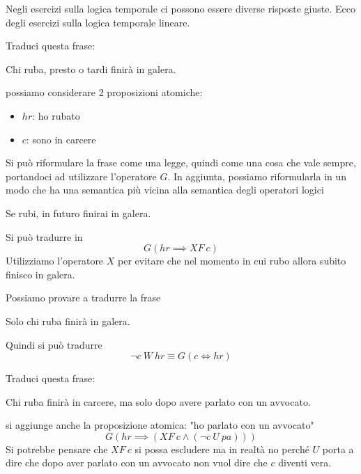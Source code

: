 Negli esercizi sulla logica temporale ci possono essere diverse risposte giuste.
Ecco degli esercizi sulla logica temporale lineare.
\begin{esempio}
    Traduci questa frase:
    \begin{center}
        Chi ruba, presto o tardi finirà in galera.
    \end{center}
    possiamo considerare 2 proposizioni atomiche:
    \begin{itemize}
        \item $hr$: ho rubato 
        \item $c$: sono in carcere
    \end{itemize}
    Si può riformulare la frase come una legge, quindi come una cosa che vale sempre,
    portandoci ad utilizzare l'operatore $G$. In aggiunta, possiamo riformularla
    in un modo che ha una semantica più vicina alla semantica degli operatori logici
    \begin{center}
        Se rubi, in futuro finirai in galera.
    \end{center}
    Si può tradurre in
    \begin{equation}
        G(hr\implies XF \ c)
    \end{equation}
    Utilizziamo l'operatore $X$ per evitare che nel momento in cui rubo allora 
    subito finisco in galera.

    Possiamo provare a tradurre la frase
    \begin{center}
        Solo chi ruba finirà in galera.
    \end{center}
    Quindi si può tradurre 
    \begin{equation}
        \lnot c \ W \ hr \equiv G(c \iff hr)
    \end{equation}
\end{esempio}
\begin{esempio}
    Traduci questa frase:
    \begin{center}
        Chi ruba finirà in carcere, ma solo dopo avere parlato con un avvocato.
    \end{center}
    si aggiunge anche la proposizione atomica: "ho parlato con un avvocato"
    \begin{equation}
        G(hr\implies (XF \ c \land (\lnot c \ U \ pa)))
    \end{equation}
    Si potrebbe pensare che $XF \ c$ si possa escludere ma in realtà no perché
    $U$ porta a dire che dopo aver parlato con un avvocato non vuol dire che $c$
    diventi vera.
\end{esempio}
